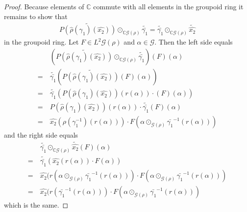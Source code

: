 \documentclass[12pt,a4paper]{scrartcl}
\theoremstyle{plain}
\theoremstyle{definition}
\numberwithin{equation}{section}
\newcommand{\C}{\mathbb{C}} %
\newcommand{\2}{\mathbb{Z} / 2 \mathbb{Z}}
\newcommand{\G}{\mathcal{G}}
\newcommand{\1}{\bar{1}}
\newcommand{\0}{\bar{0}}
\begin{document}
\begin{proof}
	Because elements of $\C$ commute with all elements in the groupoid ring it remains to show that 
	\begin{align*}
		\widetilde{P(\hat{\rho}(\gamma_1)(\hat{x_2}))} \odot_{\C\G(\rho)} \widetilde{\bar{\gamma_1}} = \widetilde{\bar{\gamma_1}} \odot_{\C\G(\rho)} \tilde{\hat{x_2}} 
	\end{align*}
	in the groupoid ring.
	Let $F \in L^2 \G(\rho)$ and $\alpha \in \G$. Then the left side equals
	\begin{align*}
		 &~ (\widetilde{P(\hat{\rho}(\gamma_1)(\hat{x_2}))} \odot_{\C\G(\rho)} \widetilde{\bar{\gamma_1}})(F)(\alpha) \\
		=&~ \widetilde{\bar{\gamma_1}}(\widetilde{P(\hat{\rho}(\gamma_1)(\hat{x_2}))}(F)(\alpha)) \\
		=&~ \widetilde{\bar{\gamma_1}}(P(\hat{\rho}(\gamma_1)(\hat{x_2}))(r(\alpha)) \cdot (F)(\alpha)) \\
		=&~ P(\hat{\rho}(\gamma_1)(\hat{x_2}))(r(\alpha)) \cdot \widetilde{\bar{\gamma_1}}(F)(\alpha) \\
		=&~ \hat{x_2}(\rho (\gamma_1^{-1})( r(\alpha))) \cdot F(\alpha \odot_{\G (\rho)} \bar{\gamma_1}^{-1}(r(\alpha)))  
	\end{align*}
	and the right side equals
	\begin{align*}
		 &~ \widetilde{\bar{\gamma_1}} \odot_{\C\G(\rho)} \tilde{\hat{x_2}}(F)(\alpha) \\
		=&~ \widetilde{\bar{\gamma_1}}(\hat{x_2}(r(\alpha)) \cdot F(\alpha)) \\
		=&~ \hat{x_2}(r(\alpha \odot_{\G (\rho)} \bar{\gamma_1}^{-1}(r(\alpha))) \cdot F(\alpha \odot_{\G (\rho)} \bar{\gamma_1}^{-1}(r(\alpha))) \\
		=&~ \hat{x_2}(r(\bar{\gamma_1}^{-1}(r(\alpha))) \cdot F(\alpha \odot_{\G (\rho)} \bar{\gamma_1}^{-1}(r(\alpha)))
	\end{align*}
	which is the same.
	

\end{proof}
\end{document}
